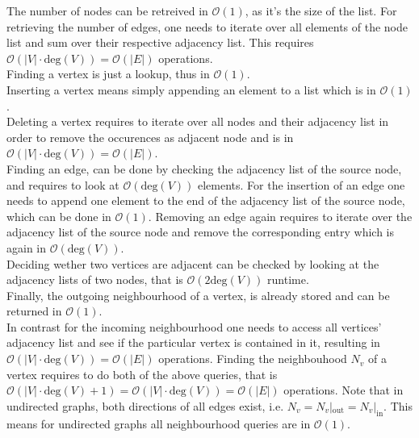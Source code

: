         The number of nodes can be retreived in $\mathcal{O}(1)$, as it's the size of the list.
        For retrieving the number of edges, one needs to iterate over all elements of the node list and sum over their respective adjacency list. This requires $\mathcal{O}(|V| \cdot \text{deg}(V)) = \mathcal{O}(|E|)$ operations. \\

        Finding a vertex is just a lookup, thus in $\mathcal{O}(1)$. \\
        Inserting a vertex means simply appending an element to a list which is in $\mathcal{O}(1)$. \\
        Deleting a vertex requires to iterate over all nodes and their adjacency list in order to remove the occurences as adjacent node and is in $\mathcal{O}(|V| \cdot \text{deg}(V)) = \mathcal{O}(|E|)$. \\
        
        Finding an edge, can be done by checking the adjacency list of the source node, and requires to look at $\mathcal{O}(\text{deg}(V))$ elements.
        For the insertion of an edge one needs to append one element to the end of the adjacency list of the source node, which can be done in $\mathcal{O}(1)$.
        Removing an edge again requires to iterate over the adjacency list of the source node and remove the corresponding entry which is again in $\mathcal{O}(\text{deg}(V))$. \\
        
        Deciding wether two vertices are adjacent can be checked by looking at the adjacency lists of two nodes, that is $\mathcal{O}(2 \text{deg}(V))$ runtime.\\
        
        Finally, the outgoing neighbourhood of a vertex, is already stored and can be returned in $\mathcal{O}(1)$.\\
        In contrast for the incoming neighbourhood one needs to access all vertices' adjacency list and see if the particular vertex is contained in it, resulting in $\mathcal{O}(|V| \cdot \text{deg}(V)) = \mathcal{O}(|E|)$ operations.
        Finding the neighbouhood $N_v$ of a vertex requires to do both of the above queries, that is $\mathcal{O}(|V| \cdot \text{deg}(V) + 1) = \mathcal{O}(|V| \cdot \text{deg}(V))  = \mathcal{O}(|E|)$ operations.  
        Note that in undirected graphs, both directions of all edges exist, i.e. $N_v = N_v |_\text{out} = N_v |_\text{in}$. This means for undirected graphs all neighbourhood queries are in $\mathcal{O}(1)$. \\
        
